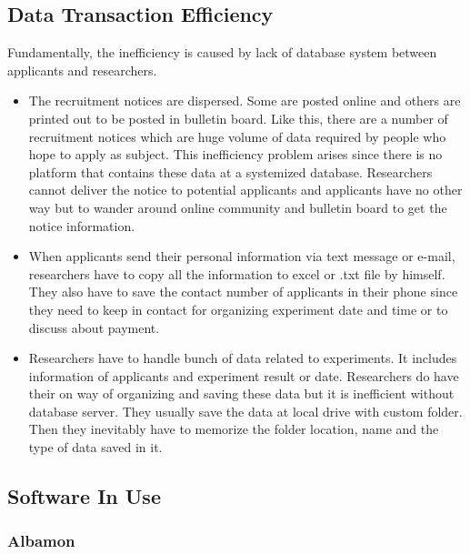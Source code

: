 \documentclass[letterpaper, 10 pt, conference]{ieeeconf}  %
\begin{document}
\subsection{Data Transaction Efficiency\\}
    Fundamentally, the inefficiency is caused by lack of database system between applicants and researchers. 
\begin{itemize}
    \item The recruitment notices are dispersed. Some are posted online and others are printed out to be posted in bulletin board. Like this, there are a number of recruitment notices which are huge volume of data required by people who hope to apply as subject. This inefficiency problem arises since there is no platform that contains these data at a systemized database. Researchers cannot deliver the notice to potential applicants and applicants have no other way but to wander around online community and bulletin board to get the notice information.
    \item When applicants send their personal information via text message or e-mail, researchers have to copy all the information to excel or .txt file by himself. They also have to save the contact number of applicants in their phone since they need to keep in contact for organizing experiment date and time or to discuss about payment. 
    \item Researchers have to handle bunch of data related to experiments. It includes information of applicants and experiment result or date. Researchers do have their on way of organizing and saving these data but it is inefficient without database server. They usually save the data at local drive with custom folder. Then they inevitably have to memorize the folder location, name and the type of data saved in it.  
\end{itemize}



\subsection{\textbf{Software In Use}}


\subsubsection{Albamon}
\end{document}
